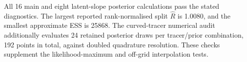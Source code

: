 All 16 main and eight latent-slope posterior calculations pass the stated diagnostics. The largest reported rank-normalised split $\widehat R$ is 1.0080, and the smallest approximate ESS is 25868. The curved-tracer numerical audit additionally evaluates 24 retained posterior draws per tracer/prior combination, 192 points in total, against doubled quadrature resolution. These checks supplement the likelihood-maximum and off-grid interpolation tests.
